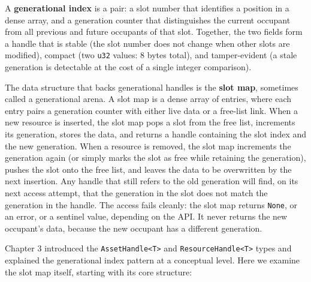 \documentclass[
  11pt,
  letterpaper,
  DIV=11,
  numbers=noendperiod,
  twoside,
  open=right]{scrreprt}
\begin{document}
A \textbf{generational index} is a pair: a slot number that identifies a
position in a dense array, and a generation counter that distinguishes
the current occupant from all previous and future occupants of that
slot. Together, the two fields form a handle that is stable (the slot
number does not change when other slots are modified), compact (two
\texttt{u32} values: 8 bytes total), and tamper-evident (a stale
generation is detectable at the cost of a single integer comparison).

The data structure that backs generational handles is the \textbf{slot
map}, sometimes called a generational arena. A slot map is a dense array
of entries, where each entry pairs a generation counter with either live
data or a free-list link. When a new resource is inserted, the slot map
pops a slot from the free list, increments its generation, stores the
data, and returns a handle containing the slot index and the new
generation. When a resource is removed, the slot map increments the
generation again (or simply marks the slot as free while retaining the
generation), pushes the slot onto the free list, and leaves the data to
be overwritten by the next insertion. Any handle that still refers to
the old generation will find, on its next access attempt, that the
generation in the slot does not match the generation in the handle. The
access fails cleanly: the slot map returns \texttt{None}, or an error,
or a sentinel value, depending on the API. It never returns the new
occupant's data, because the new occupant has a different generation.

Chapter 3 introduced the \texttt{AssetHandle\textless{}T\textgreater{}}
and \texttt{ResourceHandle\textless{}T\textgreater{}} types and
explained the generational index pattern at a conceptual level. Here we
examine the slot map itself, starting with its core structure:
\end{document}
